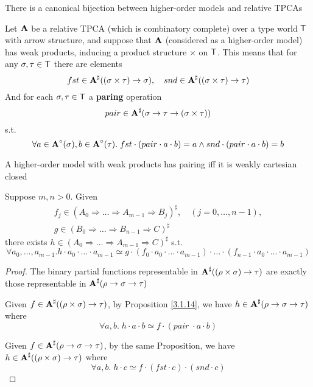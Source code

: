 \documentclass[11pt]{article}
\begin{document}
\begin{theorem}[]
There is a canonical bijection between higher-order models and relative TPCAs
\end{theorem}

Let \(\operatorname{\textbf{A}}\) be a relative TPCA (which is combinatory complete) over a type world \(\textsf{T}\) with arrow structure, and suppose
that \(\operatorname{\textbf{A}}\) (considered as a higher-order model) has weak products, inducing a product
structure \(\times\) on \(\textsf{T}\). This means that for any \(\sigma,\tau\in\textsf{T}\) there are elements
\begin{equation*}
fst\in\operatorname{\textbf{A}}^\sharp((\sigma\times\tau)\to\sigma),\quad snd\in\operatorname{\textbf{A}}^\sharp((\sigma\times\tau)\to\tau)
\end{equation*}
And for each \(\sigma,\tau\in\textsf{T}\) a \textbf{paring} operation
\begin{equation*}
pair\in\operatorname{\textbf{A}}^\sharp(\sigma\to\tau\to(\sigma\times\tau))
\end{equation*}
s.t.
\begin{equation*}
\forall a\in\operatorname{\textbf{A}}^\circ(\sigma),b\in\operatorname{\textbf{A}}^\circ(\tau).\;fst\cdot(pair\cdot a\cdot b)=a\wedge snd\cdot(pair\cdot a\cdot b)=b
\end{equation*}

\begin{proposition}[]
A higher-order model with weak products has pairing iff it is weakly cartesian closed
\end{proposition}

\begin{lemma}[\ref{3.1.14}]
Suppose \(m,n>0\). Given
\begin{gather*}
f_j\in(A_0\Rightarrow\dots\Rightarrow A_{m-1}\Rightarrow B_j)^\sharp,\quad(j=0,\dots,n-1),\\
g\in(B_0\Rightarrow\dots\Rightarrow B_{n-1}\Rightarrow C)^\sharp
\end{gather*}
there exists \(h\in (A_0\Rightarrow\dots\Rightarrow A_{m-1}\Rightarrow C)^\sharp\) s.t.
\begin{equation*}
\forall a_0,\dots,a_{m-1}.h\cdot a_0\cdot\dots\cdot a_{m-1}\simeq g\cdot(f_0\cdot a_0\cdot\dots\cdot a_{m-1})\cdot\dots\cdot(f_{n-1}\cdot a_0\cdot\dots\cdot a_{m-1})
\end{equation*}
\end{lemma}

\begin{proof}
The binary partial functions representable in \(\operatorname{\textbf{A}}^\sharp((\rho\times\sigma)\to\tau)\) are exactly those representable
in \(\operatorname{\textbf{A}}^\sharp(\rho\to\sigma\to\tau)\)

Given \(f\in\operatorname{\textbf{A}}^\sharp((\rho\times\sigma)\to\tau)\), by Proposition \ref{3.1.14}, we have \(h\in\operatorname{\textbf{A}}^\sharp(\rho\to\sigma\to\tau)\) where
\begin{equation*}
\forall a,b.\; h\cdot a\cdot b\simeq f\cdot(pair\;\cdot a\cdot b)
\end{equation*}

Given \(f\in\operatorname{\textbf{A}}^\sharp(\rho\to\sigma\to\tau)\), by the same Proposition, we have \(h\in\operatorname{\textbf{A}}^\sharp((\rho\times\sigma)\to\tau)\) where
\begin{equation*}
\forall a,b.\; h\cdot c\simeq f\cdot(fst\cdot c)\cdot(snd\cdot c)
\end{equation*}
\end{proof}
\end{document}
